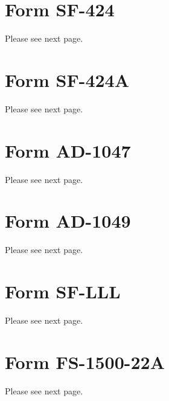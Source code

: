 \documentclass[12pt,letterpaper,english,bibliography=totocnumbered, abstract=on]{scrartcl}
\begin{document}


\newpage{}
\begin{appendices}
	
\section{Form SF-424}
Please see next page.


\section{Form SF-424A}
Please see next page.


\section{Form AD-1047}
Please see next page.


\section{Form AD-1049}
Please see next page.


\section{Form SF-LLL}
Please see next page.


\section{Form FS-1500-22A}
Please see next page.


\end{appendices}
\end{document}
